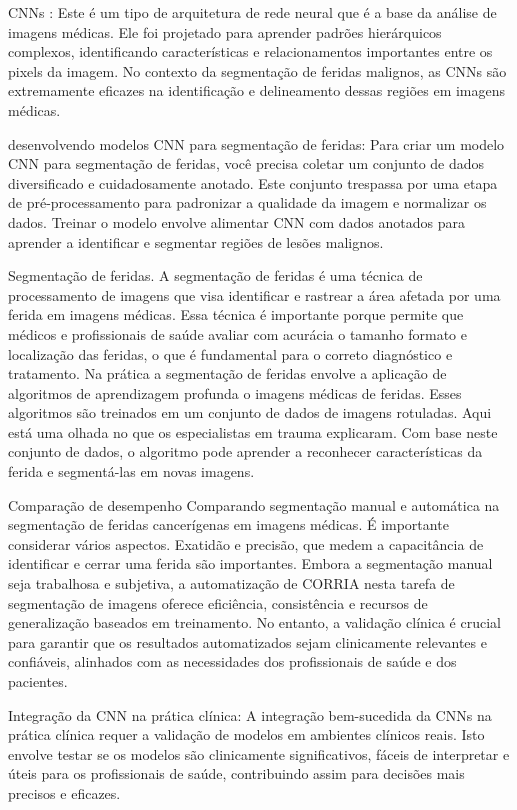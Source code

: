 \ac{CNNs }: Este é um tipo de arquitetura de rede neural que é a base da análise de imagens médicas. Ele foi projetado para aprender padrões hierárquicos complexos, identificando características e relacionamentos importantes entre os pixels da imagem. No contexto da segmentação de feridas malignos, as \ac{CNNs} são extremamente eficazes na identificação e delineamento dessas regiões em imagens médicas.

desenvolvendo modelos \ac{CNN} para segmentação de feridas: Para criar um modelo \ac{CNN } para segmentação de feridas, você precisa coletar um conjunto de dados diversificado e cuidadosamente anotado. Este conjunto trespassa por uma etapa de pré-processamento para padronizar a qualidade da imagem e normalizar os dados. Treinar o modelo envolve alimentar \ac{CNN} com dados anotados para aprender a identificar e segmentar regiões de lesões malignos.

Segmentação de feridas. A segmentação de feridas é uma técnica de processamento de imagens que visa identificar e rastrear a área afetada por uma ferida em imagens médicas. Essa técnica é importante porque permite que médicos e profissionais de saúde avaliar com acurácia o tamanho formato e localização das feridas, o que é fundamental para o correto diagnóstico e tratamento. Na prática a segmentação de feridas envolve a aplicação de algoritmos de aprendizagem profunda o imagens médicas de feridas. Esses algoritmos são treinados em um conjunto de dados de imagens rotuladas. Aqui está uma olhada no que os especialistas em trauma explicaram. Com base neste conjunto de dados, o algoritmo pode aprender a reconhecer características da ferida e segmentá-las em novas imagens.

Comparação de desempenho Comparando segmentação manual e automática na segmentação de feridas cancerígenas em imagens médicas. É importante considerar vários aspectos. Exatidão e precisão, que medem a capacitância de identificar e cerrar uma ferida são importantes. Embora a segmentação manual seja trabalhosa e subjetiva, a automatização de CORRIA nesta tarefa de segmentação de imagens oferece eficiência, consistência e recursos de generalização baseados em treinamento. No entanto, a validação clínica é crucial para garantir que os resultados automatizados sejam clinicamente relevantes e confiáveis, alinhados com as necessidades dos profissionais de saúde e dos pacientes.

Integração da \ac{CNN } na prática clínica: A integração bem-sucedida da \ac{CNNs } na prática clínica requer a validação de modelos em ambientes clínicos reais. Isto envolve testar se os modelos são clinicamente significativos, fáceis de interpretar e úteis para os profissionais de saúde, contribuindo assim para decisões mais precisos e eficazes.

